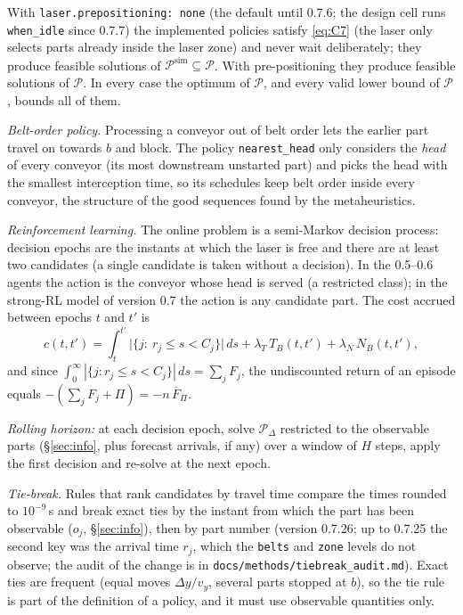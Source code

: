 \documentclass[11pt,a4paper]{article}
\theoremstyle{definition}
\theoremstyle{remark}
\newcommand{\Pb}{\mathcal{P}}
\begin{document}
With \texttt{laser.prepositioning: none} (the default until 0.7.6; the design cell runs \texttt{when\_idle} since 0.7.7) the implemented policies satisfy
\eqref{eq:C7} (the laser only selects parts already inside the laser zone) and never
wait deliberately; they produce feasible solutions of $\Pb^{\mathrm{sim}}\subseteq\Pb$.
With pre-positioning they produce feasible solutions of $\Pb$. In every case the optimum
of $\Pb$, and every valid lower bound of $\Pb$, bounds all of them.

\emph{Belt-order policy.} Processing a conveyor out of belt order lets the earlier part
travel on towards $b$ and block. The policy \texttt{nearest\_head} only considers the
\emph{head} of every conveyor (its most downstream unstarted part) and picks the head
with the smallest interception time, so its schedules keep belt order inside every
conveyor, the structure of the good sequences found by the metaheuristics.

\emph{Reinforcement learning.} The online problem is a semi-Markov decision process:
decision epochs are the instants at which the laser is free and there are at least two
candidates (a single candidate is taken without a decision). In the 0.5--0.6 agents the
action is the conveyor whose head is served (a restricted class); in the strong-RL model
of version 0.7 the action is any candidate part. The cost accrued between epochs $t$
and $t'$ is
\[
c(t,t')=\int_t^{t'}\bigl|\{j:\ r_j\le s<C_j\}\bigr|\,ds+\lambda_T\,T_B(t,t')+\lambda_N\,N_B(t,t'),
\]
and since $\int_0^\infty|\{j:r_j\le s<C_j\}|\,ds=\sum_jF_j$, the undiscounted return of
an episode equals $-(\sum_jF_j+\Pi)=-n\,\overline F_\Pi$.

\emph{Rolling horizon:} at each decision epoch, solve $\Pb_\Delta$ restricted to the
observable parts (\S\ref{sec:info}, plus forecast arrivals, if any) over a window of $H$
steps, apply the first decision and re-solve at the next epoch.

\emph{Tie-break.} Rules that rank candidates by travel time compare the times rounded to
$10^{-9}$\,s and break exact ties by the instant from which the part has been observable
($o_j$, \S\ref{sec:info}), then by part number (version 0.7.26; up to 0.7.25 the second
key was the arrival time $r_j$, which the \texttt{belts} and \texttt{zone} levels do not
observe; the audit of the change is in \texttt{docs/methods/tiebreak\_audit.md}). Exact
ties are frequent (equal moves $\Delta y/v_y$, several parts stopped at $b$), so the tie
rule is part of the definition of a policy, and it must use observable quantities only.
\end{document}

